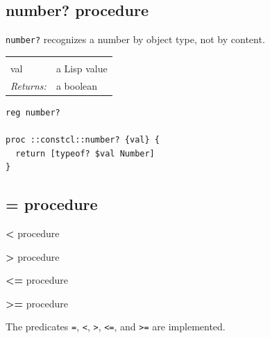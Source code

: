 \documentclass[twoside,9pt]{report}
\begin{document}
\subsection{number? procedure}
\label{number?-procedure}


\texttt{number?} recognizes a number by object type, not by content.

\noindent\begin{tabular}{ |p{1.5cm} p{8cm}| }
\hline
\rowcolor[HTML]{CCCCCC} \multicolumn{2}{|l|}{\bf number? (public)} \\
val & a Lisp value \\
\textit{Returns:} & a boolean \\
\hline
\end{tabular}
\begin{lstlisting}
reg number?
 
proc ::constcl::number? {val} {
  return [typeof? $val Number]
}
\end{lstlisting}
\subsection{= procedure}
\label{=-procedure}


\textbf{<} procedure


\textbf{>} procedure


\textbf{<=} procedure


\textbf{>=} procedure


The predicates \texttt{=}, \texttt{<}, \texttt{>}, \texttt{<=}, and \texttt{>=} are implemented.
\end{document}

